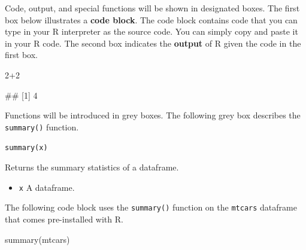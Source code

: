 \documentclass[
]{book}
\newenvironment{Shaded}{\begin{snugshade}}{\end{snugshade}}
\newcommand{\DecValTok}[1]{\textcolor[rgb]{0.00,0.00,0.81}{#1}}
\newcommand{\FunctionTok}[1]{\textcolor[rgb]{0.00,0.00,0.00}{#1}}
\newcommand{\NormalTok}[1]{#1}
\newcommand{\SpecialCharTok}[1]{\textcolor[rgb]{0.00,0.00,0.00}{#1}}
\providecommand{\tightlist}{%
  \setlength{\itemsep}{0pt}\setlength{\parskip}{0pt}}
\begin{document}
Code, output, and special functions will be shown in designated boxes. The first box below illustrates a \textbf{code block}. The code block contains code that you can type in your R interpreter as the source code. You can simply copy and paste it in your R code. The second box indicates the \textbf{output} of R given the code in the first box.

\begin{Shaded}
\begin{Highlighting}[]
\DecValTok{2}\SpecialCharTok{+}\DecValTok{2}
\end{Highlighting}
\end{Shaded}

\begin{Shaded}
\begin{Highlighting}[]
\NormalTok{\#\# [1] 4}
\end{Highlighting}
\end{Shaded}

Functions will be introduced in grey boxes. The following grey box describes the \texttt{summary()} function.

\texttt{summary(x)}

Returns the summary statistics of a dataframe.

\begin{itemize}
\tightlist
\item
  \texttt{x} A dataframe.
\end{itemize}

\hfill\break
\hfill\break
The following code block uses the \texttt{summary()} function on the \texttt{mtcars} dataframe that comes pre-installed with R.

\begin{Shaded}
\begin{Highlighting}[]
\FunctionTok{summary}\NormalTok{(mtcars)}
\end{Highlighting}
\end{Shaded}
\end{document}
